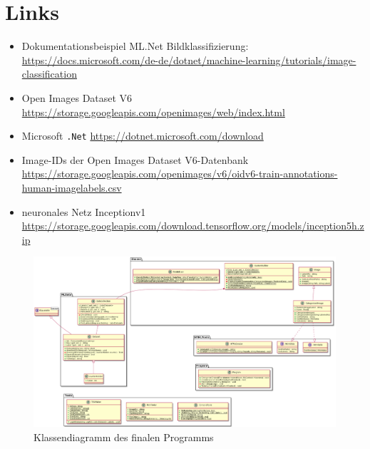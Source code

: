 \documentclass[doktyp=parbeit]{TUBAFarbeiten}
\begin{document}
\section{Links}
\begin{itemize}
	\item Dokumentationsbeispiel ML.Net Bildklassifizierung: \url{https://docs.microsoft.com/de-de/dotnet/machine-learning/tutorials/image-classification}
	\item Open Images Dataset V6 \url{https://storage.googleapis.com/openimages/web/index.html}
	\item Microsoft \texttt{.Net} \url{https://dotnet.microsoft.com/download}
	\item Image-IDs der Open Images Dataset V6-Datenbank \url{https://storage.googleapis.com/openimages/v6/oidv6-train-annotations-human-imagelabels.csv}
	\item neuronales Netz Inceptionv1 \url{https://storage.googleapis.com/download.tensorflow.org/models/inception5h.zip}
\end{itemize}
\begin{landscape}
	\begin{figure}
		\centering
		\includegraphics[width=1\linewidth]{Bilder/Classdiagramm}
		\caption{Klassendiagramm des finalen Programms}
		\label{fig:classdiagramm}
	\end{figure}
	
\end{landscape}
\end{document}
